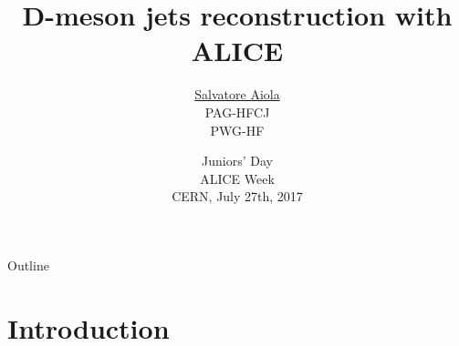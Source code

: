 \documentclass[xcolor={usenames,dvipsnames}]{beamer}
\title[D-meson jets reconstruction with ALICE] %
{D-meson jets reconstruction with ALICE}
\author[Salvatore Aiola]%
{\underline{Salvatore Aiola} \\
PAG-HFCJ\\
PWG-HF}
\institute[Yale University] %
{Yale University}
\date[July 27th, 2017] %
{Juniors' Day \\
ALICE Week \\
CERN, July 27th, 2017}
\begin{document}
\begin{frame}
  \titlepage
\end{frame}

\begin{frame}{Outline}
   \tableofcontents
\end{frame}








\section{Introduction}
\end{document}
